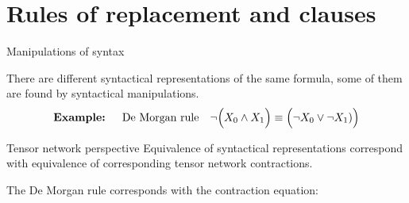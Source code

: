 \documentclass{beamer}
\begin{document}
%
%
%
%


    \section{Rules of replacement and clauses}

    \begin{frame}{Manipulations of syntax}

        There are different syntactical representations of the same formula, some of them are found by syntactical manipulations.
        \begin{align*}
            \textbf{Example: } \quad \text{De Morgan rule} \quad
            \lnot\Big(X_{0} \land X_{1}\Big)
            \equiv \Big(\lnot X_{0} \lor \lnot X_{1})\Big)
        \end{align*}

        \begin{block}{Tensor network perspective}
            Equivalence of syntactical representations correspond with equivalence of corresponding tensor network contractions.
        \end{block}

        The De Morgan rule corresponds with the contraction equation:
        

    \end{frame}
\end{document}
